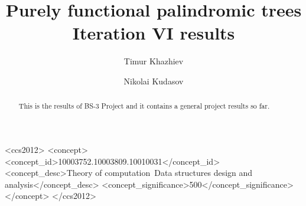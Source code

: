 \documentclass[sigconf]{acmart}
\begin{document}
\title{Purely functional palindromic trees \\ Iteration VI results}


\author{Timur Khazhiev}

\author{Nikolai Kudasov}

\begin{abstract}
  This is the results of BS-3 Project and it contains
  a general project results so far.
\end{abstract}

%
%
\begin{CCSXML}
<ccs2012>
<concept>
<concept_id>10003752.10003809.10010031</concept_id>
<concept_desc>Theory of computation~Data structures design and analysis</concept_desc>
<concept_significance>500</concept_significance>
</concept>
</ccs2012>
\end{CCSXML}



\maketitle


\end{document}
